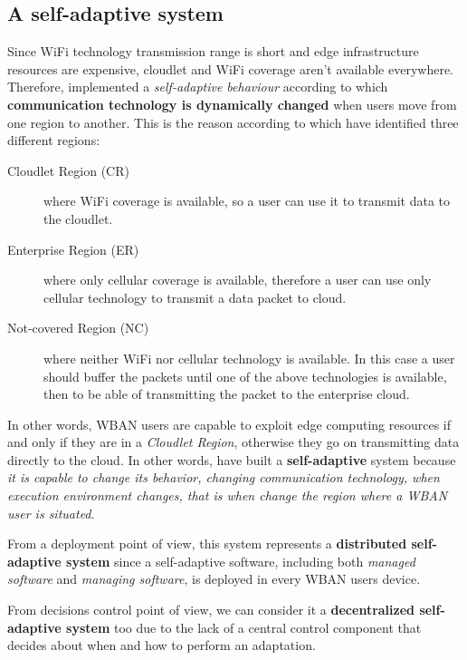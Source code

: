 \documentclass[sigchi]{acmart}
\begin{document}
\subsection{A self-adaptive system}

Since WiFi technology transmission range is short and edge infrastructure resources are expensive, cloudlet and WiFi coverage aren't available everywhere. Therefore, \citet{MSAReport} implemented a \textit{self-adaptive behaviour} according to which \textbf{communication technology is dynamically changed} when users move from one region to another. This is the reason according to which \citet{MSAReport} have identified three different regions:\cite[par.~3.1]{MSAReport} 

\begin{description}

\item[Cloudlet Region (CR)] where WiFi coverage is available, so a user can use it to transmit data to the cloudlet.

\item[Enterprise Region (ER)] where only cellular coverage is available, therefore  a user can use only cellular technology to transmit a data packet to cloud. 

\item[Not-covered Region (NC)] where neither WiFi nor cellular technology is available. In this case a user should buffer the packets until one of the above technologies is available, then to be able of transmitting the packet to the enterprise cloud. 

\end{description}

In other words, WBAN users are capable to exploit edge computing resources if and only if they are in a \textit{Cloudlet Region}, otherwise they go on transmitting data directly to the cloud. In other words, \citet{MSAReport} have built a \textbf{self-adaptive} system because \textit{it is capable to change its behavior, changing communication technology, when execution environment changes, that is when change the region where a WBAN user is situated}. 

From a deployment point of view, this system represents a \textbf{distributed self-adaptive system} since a self-adaptive software, including both \textit{managed software} and \textit{managing software}, is deployed in every WBAN users device.\cite{PatternsDecentralizedSelf}

From decisions control point of view, we can consider it a \textbf{decentralized self-adaptive system} too due to the lack of a central control component that decides about when and how to perform an adaptation.\cite{PatternsDecentralizedSelf} 
\end{document}
